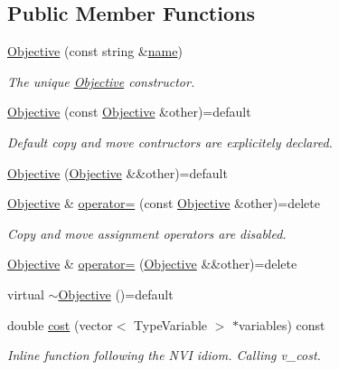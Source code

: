 \subsection*{Public Member Functions}
\begin{DoxyCompactItemize}
\item 
\hyperlink{classghost_1_1Objective_a05c72fc98983001626a5ffd4609fc4d1}{Objective} (const string \&\hyperlink{classghost_1_1Objective_a02aee324f6958b6c533f27ec430690fe}{name})
\begin{DoxyCompactList}\small\item\em The unique \hyperlink{classghost_1_1Objective}{Objective} constructor. \end{DoxyCompactList}\item 
\hyperlink{classghost_1_1Objective_a55b4f0ff2fdfc2ace35db536cc95ba20}{Objective} (const \hyperlink{classghost_1_1Objective}{Objective} \&other)=default
\begin{DoxyCompactList}\small\item\em Default copy and move contructors are explicitely declared. \end{DoxyCompactList}\item 
\hyperlink{classghost_1_1Objective_afb34a86055233acc3ebfb783f96a8e89}{Objective} (\hyperlink{classghost_1_1Objective}{Objective} \&\&other)=default
\item 
\hyperlink{classghost_1_1Objective}{Objective} \& \hyperlink{classghost_1_1Objective_a20f373a941afba7e3b6dbeb04ee4122d}{operator=} (const \hyperlink{classghost_1_1Objective}{Objective} \&other)=delete
\begin{DoxyCompactList}\small\item\em Copy and move assignment operators are disabled. \end{DoxyCompactList}\item 
\hyperlink{classghost_1_1Objective}{Objective} \& \hyperlink{classghost_1_1Objective_a8efc3f91216e6f50685e09da8cc3f04c}{operator=} (\hyperlink{classghost_1_1Objective}{Objective} \&\&other)=delete
\item 
virtual \hyperlink{classghost_1_1Objective_aade47b263cbe7cae55e237b423dc4895}{$\sim$\-Objective} ()=default
\item 
double \hyperlink{classghost_1_1Objective_ac46e9305c3a92db9dff2d233a7c07088}{cost} (vector$<$ Type\-Variable $>$ $\ast$variables) const 
\begin{DoxyCompactList}\small\item\em Inline function following the N\-V\-I idiom. Calling v\-\_\-cost. \end{DoxyCompactList}\item 

\end{DoxyCompactItemize}

